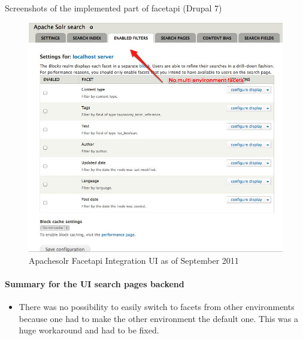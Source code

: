 Screenshots of the implemented part of facetapi (Drupal 7)
\begin{figure}[H]
     \includegraphics[width=\textwidth]{images/facetapI_ui_september_2011.jpg}
     \caption{Apachesolr Facetapi Integration UI as of September 2011}
\end{figure}
\paragraph{Summary for the UI search pages backend}
\begin{itemize}
\item There was no possibility to easily switch to facets from other environments because one had to make the other environment the default one. This was a huge workaround and had to be fixed.
\end{itemize}

